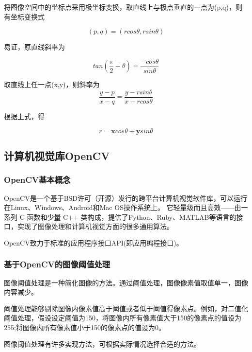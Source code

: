 \documentclass{article}
\begin{document}
将图像空间中的坐标点采用极坐标变换，取直线上与极点垂直的一点为(p,q)，则有坐标变换式

$$
(p,q)=(rcos\theta,rsin\theta)
$$

易证，原直线斜率为



\begin{equation*}
    tan(\frac{\pi}{2}+\theta)=\frac{-cos\theta}{sin\theta}
\end{equation*}

取直线上任一点(x,y)，则斜率为
\begin{equation*}
    \frac{y-p}{x-q}=\frac{y-rsin\theta}{x-rcos\theta}
\end{equation*}

根据上式，得

$$
    r=\textbf{x}cos\theta+\textbf{y}sin\theta
$$


\subsection{计算机视觉库OpenCV}
\subsubsection{OpenCV基本概念}
OpenCV是一个基于BSD许可（开源）发行的跨平台计算机视觉软件库，可以运行在Linux、Windows、Android和Mac OS操作系统上。 它轻量级而且高效——由一系列 C 函数和少量 C++ 类构成，提供了Python、Ruby、MATLAB等语言的接口，实现了图像处理和计算机视觉方面的很多通用算法。

OpenCV致力于标准的应用程序接口API(即应用编程接口)。

\subsubsection{基于OpenCV的图像阈值处理}
图像阈值处理是一种简化图像的方法。通过阈值处理，图像像素值取值单一，图像内容减少。

阈值处理能够剔除图像内像素值高于阈值或者低于阈值得像素点。例如，对二值化阈值处理，假设设定阈值为150，将图像内所有像素值大于150的像素点的值设为255;将图像内所有像素值小于150的像素点的值设为0。

图像阈值处理有许多实现方法，可根据实际情况选择合适的方法。
\end{document}
